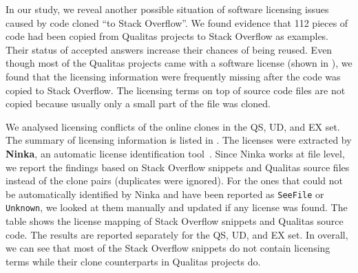 \documentclass[sigconf,review, anonymous]{acmart}
\begin{document}


In our study, we reveal another possible situation of software licensing issues caused by code cloned ``to Stack Overflow''. We found evidence that 112 pieces of code had been copied from Qualitas projects to Stack Overflow as examples. Their status of accepted answers increase their chances of being reused. Even though most of the Qualitas projects came with a software license (shown in ), we found that the licensing information were frequently missing after the code was copied to Stack Overflow. The licensing terms on top of source code files are not copied because usually only a small part of the file was cloned. %

We analysed licensing conflicts of the online clones in the QS, UD, and EX set. The summary of licensing information is listed in . The licenses were extracted by \textbf{Ninka}, an automatic license identification tool~\cite{German2010}. Since Ninka works at file level, we report the findings based on Stack Overflow snippets and Qualitas source files instead of the clone pairs (duplicates were ignored). For the ones that could not be automatically identified by Ninka and have been reported as {\small\texttt{SeeFile}} or {\small\texttt{Unknown}}, we looked at them manually and updated if any license was found. The table shows the license mapping of Stack Overflow snippets and Qualitas source code. The results are reported separately for the QS, UD, and EX set. In overall, we can see that most of the Stack Overflow snippets do not contain licensing terms while their clone counterparts in Qualitas projects do. 
\end{document}
